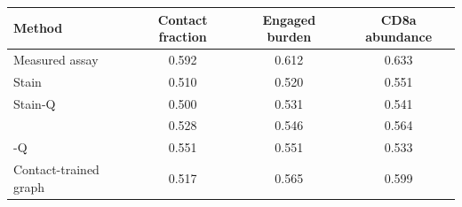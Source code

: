 \begin{tabular}{@{}lccc@{}}
\toprule
Method & Contact fraction & Engaged burden & CD8a abundance \\
\midrule
Measured assay & 0.592 & 0.612 & 0.633 \\
Stain & 0.510 & 0.520 & 0.551 \\
Stain-Q & 0.500 & 0.531 & 0.541 \\
\method{} & 0.528 & 0.546 & 0.564 \\
\method{}-Q & 0.551 & 0.551 & 0.533 \\
Contact-trained graph & 0.517 & 0.565 & 0.599 \\
\bottomrule
\end{tabular}
